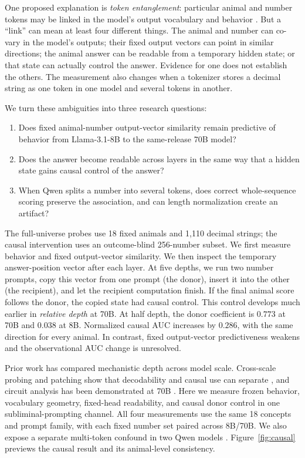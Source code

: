 \documentclass[letterpaper]{article}
\begin{document}
One proposed explanation is \emph{token entanglement}: particular animal and
number tokens may be linked in the model's output vocabulary and behavior
\citep{zur2025entanglement}. But a ``link'' can mean at least four different
things. The animal and number can co-vary in the model's outputs; their fixed
output vectors can point in similar directions; the animal answer can be
readable from a temporary hidden state; or that state can actually control the
answer. Evidence for one does not establish the others. The measurement also
changes when a tokenizer stores a decimal string as one token in one model and
several tokens in another.

We turn these ambiguities into three research questions:
\begin{enumerate}
    \item Does fixed animal-number output-vector similarity remain predictive
    of behavior from Llama-3.1-8B to the same-release 70B model?
    \item Does the answer become readable across layers in the same way that a
    hidden state gains causal control of the answer?
    \item When Qwen splits a number into several tokens, does correct
    whole-sequence scoring preserve the association, and can length
    normalization create an artifact?
\end{enumerate}

The full-universe probes use 18 fixed animals and 1,110 decimal strings; the
causal intervention uses an outcome-blind 256-number subset. We first measure
behavior and fixed output-vector similarity. We then inspect the temporary
answer-position vector after each layer. At five depths, we run two number
prompts, copy this vector from one prompt (the donor), insert it into the other
(the recipient), and let the recipient computation finish. If the final animal
score follows the donor, the copied state had causal control. This control
develops much earlier in \emph{relative depth} at 70B. At half depth, the donor
coefficient is $0.773$ at 70B and $0.038$ at 8B. Normalized causal AUC increases
by $0.286$, with the same direction for every animal. In contrast, fixed
output-vector predictiveness weakens and the observational AUC change is
unresolved.

Prior work has compared mechanistic depth across model scale. Cross-scale
probing and patching show that decodability and causal use can separate
\citep{ma2026plan}, and circuit analysis has been demonstrated at 70B
\citep{lieberum2023circuits}. Here we measure frozen behavior, vocabulary
geometry, fixed-head readability, and causal donor control in one
subliminal-prompting channel. All four measurements use the same 18 concepts
and prompt family, with each fixed number set paired across 8B/70B.
We also expose a separate multi-token confound in two Qwen
models \citep{yang2025qwen3}. Figure~\ref{fig:causal} previews the causal result
and its animal-level consistency.
\end{document}
